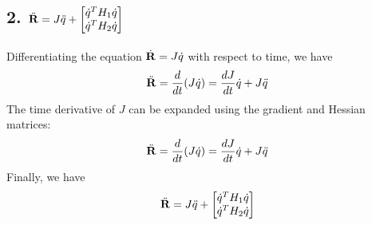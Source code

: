 \documentclass{article}
\begin{document}
\subsection*{2. $\ddot{\bf{R}} = J \ddot{q} + \begin{bmatrix} \dot{q}^T H_1 \dot{q} \\ \dot{q}^T H_2 \dot{q} \end{bmatrix}$ }
Differentiating the equation $\dot{\bf{R}} = J \dot{q}$ with respect to time, we have
\begin{equation}
\ddot{\bf{R}} = \frac{d}{dt}(J \dot{q}) = \frac{dJ}{dt} \dot{q} + J \ddot{q}
\end{equation}
The time derivative of $J$ can be expanded using the gradient and Hessian matrices:
\begin{equation}
\ddot{\bf{R}} = \frac{d}{dt}(J \dot{q}) = \frac{dJ}{dt} \dot{q} + J \ddot{q}
\end{equation}
Finally, we have
\begin{equation}
\ddot{\bf{R}} = J \ddot{q} + \begin{bmatrix} \dot{q}^T H_1 \dot{q} \\ \dot{q}^T H_2 \dot{q} \end{bmatrix}
\end{equation}
\end{document}
